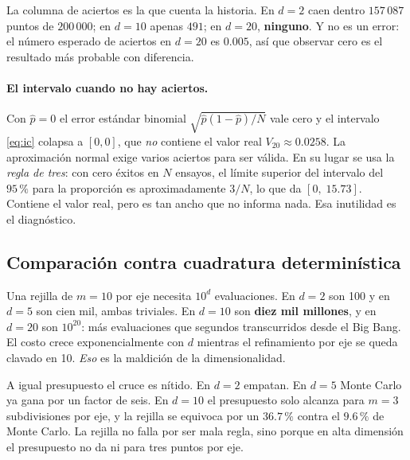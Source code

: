 La columna de aciertos es la que cuenta la historia. En $d=2$ caen dentro
$157\,087$ puntos de $200\,000$; en $d=10$ apenas $491$; en $d=20$,
\textbf{ninguno}. Y no es un error: el número esperado de aciertos en $d=20$ es
$0.005$, así que observar cero es el resultado más probable con diferencia.

\paragraph{El intervalo cuando no hay aciertos.} Con $\hat p = 0$ el error
estándar binomial $\sqrt{\hat p(1-\hat p)/N}$ vale cero y el intervalo
\eqref{eq:ic} colapsa a $[0,0]$, que \emph{no} contiene el valor real
$V_{20} \approx 0.0258$. La aproximación normal exige varios aciertos para ser
válida. En su lugar se usa la \emph{regla de tres}: con cero éxitos en $N$
ensayos, el límite superior del intervalo del $95\,\%$ para la proporción es
aproximadamente $3/N$, lo que da $[0,\;15.73]$. Contiene el valor real, pero es
tan ancho que no informa nada. Esa inutilidad es el diagnóstico.

\subsection{Comparación contra cuadratura determinística}

\begin{table}[H]
\centering\small

\caption{Cuadratura en rejilla con $m = 10$ subdivisiones por eje.}
\label{tab:mc-rejilla}
\end{table}

Una rejilla de $m=10$ por eje necesita $10^d$ evaluaciones. En $d=2$ son 100 y
en $d=5$ son cien mil, ambas triviales. En $d=10$ son \textbf{diez mil
millones}, y en $d=20$ son $10^{20}$: más evaluaciones que segundos
transcurridos desde el Big Bang. El costo crece exponencialmente con $d$
mientras el refinamiento por eje se queda clavado en 10. \emph{Eso} es la
maldición de la dimensionalidad.

\begin{table}[H]
\centering\small

\caption{Error a igual presupuesto de evaluaciones: se elige $m$ tal que
$m^d \approx 200\,000$.}
\label{tab:mc-presupuesto}
\end{table}

A igual presupuesto el cruce es nítido. En $d=2$ empatan. En $d=5$ Monte Carlo
ya gana por un factor de seis. En $d=10$ el presupuesto solo alcanza para
$m=3$ subdivisiones por eje, y la rejilla se equivoca por un $36.7\,\%$ contra
el $9.6\,\%$ de Monte Carlo. La rejilla no falla por ser mala regla, sino
porque en alta dimensión el presupuesto no da ni para tres puntos por eje.

